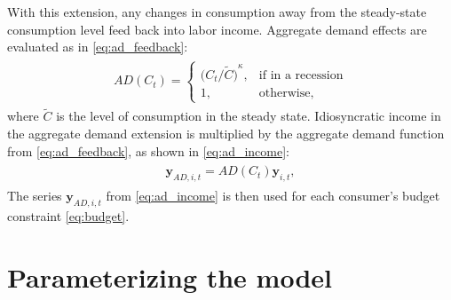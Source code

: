 \documentclass[qe,draft]{econsocart}
\theoremstyle{plain}
\theoremstyle{definition}
\begin{document}
With this extension, any changes in consumption away from the steady-state consumption level feed back into labor income.
Aggregate demand effects are evaluated as in \eqref{eq:ad_feedback}:
\begin{equation}
  \begin{gathered}
    \begin{aligned}
      AD(C_t) =   \begin{cases}{\Big(C_t/\tilde{C}\Big)}^\kappa, & \text{if in a recession} \\
             1,                                & \text{otherwise} ,
                  \end{cases}
      \label{eq:ad_feedback} %
    \end{aligned}
  \end{gathered}
\end{equation}
where $\tilde{C}$ is the level of consumption in the steady state.
Idiosyncratic income in the aggregate demand extension is multiplied by the aggregate demand function from \eqref{eq:ad_feedback}, as shown in \eqref{eq:ad_income}:
\begin{equation}
  \begin{gathered}
    \begin{aligned}
      \mathbf{y}_{AD,i,t} = AD(C_t)\mathbf{y}_{i,t},
      \label{eq:ad_income} %
    \end{aligned}
  \end{gathered}
\end{equation}
The series $\mathbf{y}_{AD,i,t}$ from \eqref{eq:ad_income} is then used for each consumer's budget constraint \eqref{eq:budget}.

\captionsetup[figure]{list=no}
\captionsetup[table]{list=no}

\section{Parameterizing the model}
\label{sec:parameters}
\end{document}

